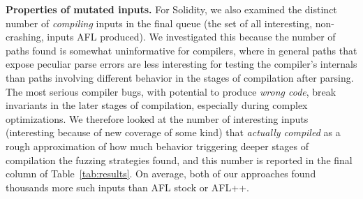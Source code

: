 \textbf{Properties of mutated inputs.} For Solidity, we also examined the distinct number of \emph{compiling}
inputs in the final queue (the set of all interesting, non-crashing,
inputs AFL produced).  We investigated this because the number of
paths found is somewhat uninformative for compilers, where in general
paths that expose peculiar parse errors are less interesting for
testing the compiler's internals than paths involving different
behavior in the stages of compilation after parsing.  The most serious
compiler bugs, with potential to produce \emph{wrong code}, break
invariants in the later stages of compilation, especially during
complex optimizations.  We therefore looked
at the number of interesting inputs (interesting because of new
coverage of some kind) that \emph{actually compiled} as a rough
approximation of how much behavior triggering deeper stages of
compilation the fuzzing strategies found, and this number is reported in the
final column of Table~\ref{tab:results}.  On average, both of our approaches
found thousands more such inputs than AFL stock or AFL++.


